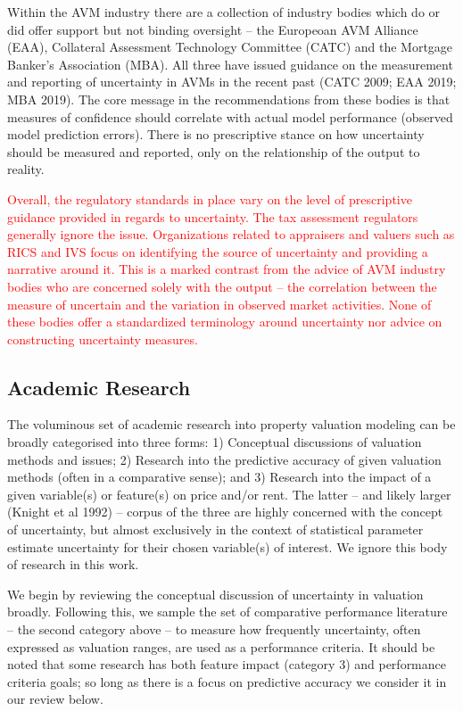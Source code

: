 \documentclass[colTwo]{anon}
\theoremstyle{definition}
\begin{document}
Within the AVM industry there are a collection of industry bodies which do or did offer support but not binding oversight -- the Europeoan AVM Alliance (EAA), Collateral Assessment Technology Committee (CATC) and the Mortgage Banker's Association (MBA). All three have issued guidance on the measurement and reporting of uncertainty in AVMs in the recent past (CATC 2009; EAA 2019; MBA 2019).  The core message in the recommendations from these bodies is that measures of confidence should correlate with actual model performance (observed model prediction errors). There is no prescriptive stance on how uncertainty should be measured and reported, only on the relationship of the output to reality.    

\textcolor{red}{Overall, the regulatory standards in place vary on the level of prescriptive guidance provided in regards to uncertainty.  The tax assessment regulators generally ignore the issue. Organizations related to appraisers and valuers such as RICS and IVS focus on identifying the source of uncertainty and providing a narrative around it.  This is a marked contrast from the advice of AVM industry bodies who are concerned solely with the output -- the correlation between the measure of uncertain and the variation in observed market activities. None of these bodies offer a standardized terminology around uncertainty nor advice on constructing uncertainty measures.}    

\subsection{Academic Research}

The voluminous set of academic research into property valuation modeling can be broadly categorised into three forms: 1) Conceptual discussions of valuation methods and issues; 2) Research into the predictive accuracy of given valuation methods (often in a comparative sense); and  3) Research into the impact of a given variable(s) or feature(s) on price and/or rent.  The latter -- and likely larger (Knight et al 1992) -- corpus of the three are highly concerned with the concept of uncertainty, but almost exclusively in the context of statistical parameter estimate uncertainty for their chosen variable(s) of interest. We ignore this body of research in this work. 

We begin by reviewing the conceptual discussion of uncertainty in valuation broadly.  Following this, we sample the set of comparative performance literature -- the second category above -- to measure how frequently uncertainty, often expressed as valuation ranges, are used as a performance criteria. It should be noted that some research has both feature impact (category 3) and performance criteria goals; so long as there is a focus on predictive accuracy we consider it in our review below. 
\end{document}
